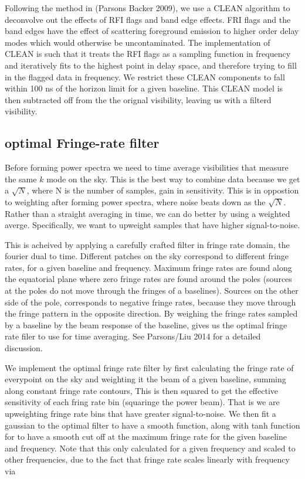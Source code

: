 \documentclass[twocolumn,numberedappendix]{emulateapj}
\begin{document}
Following the method in (Parsons Backer 2009), we use a CLEAN
algorithm to deconvolve out the effects of RFI flags and band edge effects. FRI
flags and the band edges have the effect of scattering foreground emission to
higher order delay modes which would otherwise be uncontaminated. The
implementation of CLEAN is such that it treats the RFI flags as a sampling
function in frequency and iteratively fits to the highest point in delay space,
and therefore trying to fill in the flagged data in frequency. We restrict these
CLEAN components to fall within 100 ns of the horizon limit for a given
baseline.  This CLEAN model is then subtracted off from the the orignal
visibility, leaving us with a filterd visibility.




\subsection{optimal Fringe-rate filter}
Before forming power spectra we need to time average visibilities that measure
the same $k$ mode on the sky. This is the best way to combine data because we
get a $\sqrt{N}$, where N is the number of samples, gain in sensitivity. This is
in oppostion to weighting after forming power spectra, where noise beats down as
the $\sqrt{N}$. Rather than a straight averaging in time, we can do better by
using a weighted averge. Specifically, we want to upweight samples that have
higher signal-to-noise. 

This is acheived by applying a carefully crafted filter in fringe rate domain,
the fourier dual to time. Different patches on the sky correspond to different
fringe rates, for a given baseline and frequency. Maximum fringe rates are found
along the equatorial plane where zero fringe rates are found around the poles
(sources at the poles do not move through the fringes of a baselines). Sources
on the other side of the pole, corresponds to negative fringe rates, because
they move through the fringe pattern in the opposite direction. By weighing the
fringe rates sampled by a baseline by the beam response of the baseline, gives
us the optimal fringe rate filer to use for time averaging. See Parsons/Liu 2014
for a detailed discussion.

We implement the optimal fringe rate filter by first calculating the fringe rate
of everypoint on the sky and weighting it the beam of a given baseline, summing
along constant fringe rate contours, This is then squared to get the effective
sensitivity of each fring rate bin (squaringe the power beam). That is we are
upweighting fringe rate bins that have greater signal-to-noise.  We then fit a
gaussian to the optimal filter to have a smooth function, along with tanh
function for to have a smooth cut off at the maximum fringe rate for the given
baseline and frequency.  Note that this only calculated for a given frequency
and scaled to other frequencies, due to the fact that fringe rate scales
linearly with frequency via
\end{document}
